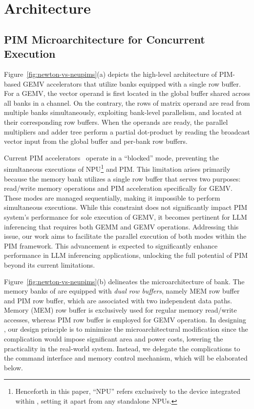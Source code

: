 \section{\neupims Architecture}
\label{sec:architecture}

       
%
\subsection{PIM Microarchitecture for Concurrent Execution}


%
Figure~\ref{fig:newton-vs-neupims}(a) depicts the high-level architecture of PIM-based GEMV accelerators that utilize banks equipped with a single row buffer.
%
For a GEMV, the vector operand is first located in the global buffer shared across all banks in a channel.
%
On the contrary, the rows of matrix operand are read from multiple banks simultaneously, exploiting bank-level parallelism, and located at their corresponding row buffers.
%
When the operands are ready, the parallel multipliers and adder tree perform a partial dot-product by reading the broadcast vector input from the global buffer and per-bank row buffers.
%

%
Current PIM accelerators~\cite{newton, hbm_pim, aespa} operate in a ``blocked'' mode, preventing the simultaneous executions of NPU\footnote{
%
Henceforth in this paper, ``NPU'' refers exclusively to the device integrated within \neupims, setting it apart from any standalone NPUs.
%
} and PIM. 
%
This limitation arises primarily because the memory bank utilizes a single row buffer that serves two purposes: read/write memory operations and PIM acceleration specifically for GEMV.
%
These modes are managed sequentially, making it impossible to perform simultaneous executions. 
%
While this constraint does not significantly impact PIM system's performance for sole execution of GEMV, it becomes pertinent for LLM inferencing that requires both GEMM and GEMV operations.
%
Addressing this issue, our work aims to facilitate the parallel execution of both modes within the PIM framework. 
%
This advancement is expected to significantly enhance performance in LLM inferencing applications, unlocking the full potential of PIM beyond its current limitations.


%
Figure~\ref{fig:newton-vs-neupims}(b) delineates the microarchitecture of \neupims bank. 
%
The memory banks of \neupims are equipped with \emph{dual row buffers}, namely MEM row buffer and PIM row buffer, which are associated with two independent data paths. 
%
Memory (MEM) row buffer is exclusively used for regular memory read/write accesses, whereas PIM row buffer is employed for GEMV operation. 
%
In designing \neupims, our design principle is to minimize the microarchitectural modification since the complication would impose significant area and power costs, lowering the practicality in the real-world system. 
%
Instead, we delegate the complications to the command interface and memory control mechanism, which will be elaborated below.
%

